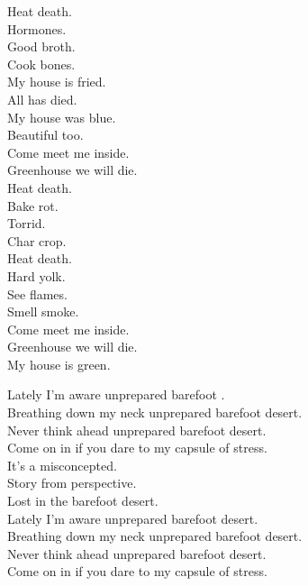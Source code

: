 Heat death. \\
Hormones. \\
Good broth. \\
Cook bones. \\

My house is fried. \\
All  has died. \\
My house was blue. \\
Beautiful too. \\

Come meet me inside. \\
Greenhouse we will die. \\

Heat death. \\
Bake rot. \\
Torrid. \\
Char crop. \\
Heat death. \\
Hard yolk. \\
See flames. \\
Smell smoke. \\

Come meet me inside. \\
Greenhouse we will die. \\
My house is green. \\




Lately I'm aware unprepared barefoot . \\
Breathing down my neck unprepared barefoot desert. \\
Never think ahead unprepared barefoot desert. \\
Come on in if you dare to my capsule of stress. \\

It's a misconcepted. \\
Story from perspective. \\
Lost in the barefoot desert. \\

Lately I'm aware unprepared barefoot desert. \\
Breathing down my neck unprepared barefoot desert. \\
Never think ahead unprepared barefoot desert. \\
Come on in if you dare to my capsule of stress. \\

